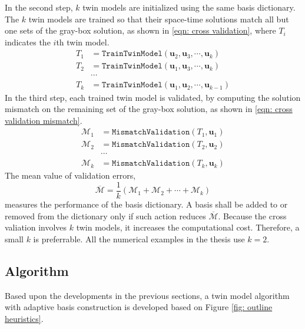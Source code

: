 In the second step, $k$ twin models are initialized using the same basis dictionary.
The $k$ twin models are trained so that their space-time solutions match
all but one sets of the gray-box solution, as shown in \eqref{eqn: cross validation}, where
$T_i$ indicates the $i$th twin model.
\begin{equation}\begin{split}
T_1 &= \texttt{TrainTwinModel}(\boldsymbol{u}_2, \boldsymbol{u}_3, \cdots, \boldsymbol{u}_k)\\
T_2 &= \texttt{TrainTwinModel}(\boldsymbol{u}_1, \boldsymbol{u}_3, \cdots, \boldsymbol{u}_k)\\
&\cdots\\
T_k &= \texttt{TrainTwinModel}(\boldsymbol{u}_1, \boldsymbol{u}_2, \cdots, \boldsymbol{u}_{k-1})
\label{eqn: cross validation}
\end{split}\end{equation}
In the third step, each trained twin model is validated, by computing
the solution mismatch on the remaining set of the gray-box solution, as shown in 
\eqref{eqn: cross validation mismatch}.
\begin{equation}\begin{split}
    \mathcal{M}_1 &= \texttt{MismatchValidation}\left( T_1 , \boldsymbol{u}_1\right)\\
    \mathcal{M}_2 &= \texttt{MismatchValidation}\left( T_2 , \boldsymbol{u}_2\right)\\
    &\cdots\\
    \mathcal{M}_k &= \texttt{MismatchValidation}\left( T_k , \boldsymbol{u}_k\right)
    \label{eqn: cross validation mismatch}
\end{split}\end{equation}
The mean value of validation errors,
\begin{equation}
    \overline{\mathcal{M}} = \frac{1}{k}\left(\mathcal{M}_1 + \mathcal{M}_2 + \cdots 
    + \mathcal{M}_k\right)
\end{equation}
measures the performance of the basis dictionary. A basis shall be added to or removed from
the dictionary only if such action reduces $\overline{\mathcal{M}}$. Because the cross valiation
involves $k$ twin models, it increases the computational cost.
Therefore, a small $k$ is preferrable.
All the numerical examples in the thesis use $k=2$.\\

\subsection{Algorithm}
\label{sec: twin algo}
Based upon the developments in the previous sections, a twin model algorithm 
with adaptive basis construction is developed based on Figure \ref{fig: outline heuristics}. \\

